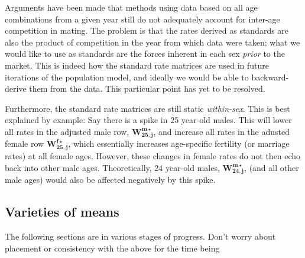Arguments have been made that methods using data based on all age combinations from a given year still do not adequately account for inter-age competition in mating. The problem is that the rates derived as standards are also the product of competition in the year from which data were taken; what we would like to use as standards are the forces inherent in each sex \textit{prior} to the market. This is indeed how the standard rate matrices are used in future iterations of the population model, and ideally we would be able to backward-derive them from the data. This particular point has yet to be resolved.

Furthermore, the standard rate matrices are still static \textit{within-sex}. This is best explained by example: Say there is a spike in 25 year-old males. This will lower all rates in the adjusted male row, $\bm{W_{25,j}^{m\star}}$, and increase all rates in the adusted female row $\bm{W_{25,j}^{f\star}}$, which essentially increases age-specific fertility (or marriage rates) at all female ages. However, these changes in female rates do not then echo back into other male ages. Theoretically, 24 year-old males, $\bm{W_{24,j}^{m\star}}$, (and all other male ages) would also be affected negatively by this spike. 

\subsection{Varieties of means}



\citet{keyfitz1972mathematics}

The following sections are in various stages of progress.
Don't worry about placement or consistency with the above for the time being









